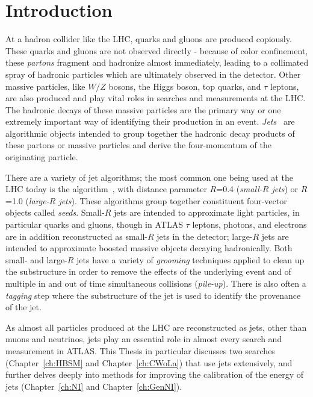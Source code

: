 \section{Introduction}
At a hadron collider like the LHC, quarks and gluons are produced copiously.
These quarks and gluons are not observed directly - because of color confinement, these \textit{partons} fragment and hadronize almost immediately, leading to a collimated spray of hadronic particles which are ultimately observed in the detector.
Other massive particles, like $W/Z$ bosons, the Higgs boson, top quarks, and $\tau$ leptons, are also produced and play vital roles in searches and measurements at the LHC.
The hadronic decays of these massive particles are the primary way or one extremely important way of identifying their production in an event.
\textit{Jets}~\cite{Ali:2010tw,Asquith:2018igt,Larkoski:2017jix,Salam:2009jx} are algorithmic objects intended to group together the hadronic decay products of these partons or massive particles and derive the four-momentum of the originating particle.

There are a variety of jet algorithms; the most common one being used at the LHC today is the \antikt{} algorithm~\cite{Cacciari:2008gp}, with distance parameter $R$=0.4 (\textit{small-$R$ jets}) or $R$=1.0 (\textit{large-$R$ jets}).
These algorithms group together constituent four-vector objects called \textit{seeds}.
Small-$R$ jets are intended to approximate light particles, in particular quarks and gluons, though in ATLAS $\tau$ leptons, photons, and electrons are in addition reconstructed as small-$R$ jets in the detector; large-$R$ jets are intended to approximate boosted massive objects decaying hadronically.
Both small- and large-$R$ jets have a variety of \textit{grooming} techniques applied to clean up the substructure in order to remove the effects of the underlying event and of multiple in and out of time simultaneous collisions (\textit{pile-up}).
There is also often a \textit{tagging} step where the substructure of the jet is used to identify the provenance of the jet.

As almost all particles produced at the LHC are reconstructed as jets, other than muons and neutrinos, jets play an essential role in almost every search and measurement in ATLAS.
This Thesis in particular discusses two searches (Chapter~\ref{ch:HBSM} and Chapter~\ref{ch:CWoLa}) that use jets extensively, and further delves deeply into methods for improving the calibration of the energy of jets (Chapter~\ref{ch:NI} and Chapter~\ref{ch:GenNI}).

